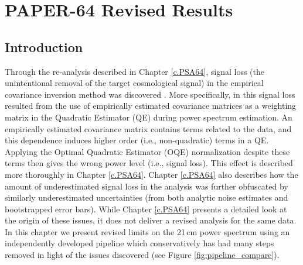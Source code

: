 \newcommand{\upperlims}{$(1440$ mK$)^{2}$, $(1850$ mK$)^{2}$, $(290$ mK$)^{2}$, $(190$ mK$)^{2}$, $(360$ mK$)^{2}$, $(290$ mK$)^{2}$ at redshifts $z=10.87,\ 9.93,\ 8.68,\ 8.37,\  8.13,$ and $7.48$, respectively}
\newcommand{\hMpci}{h\ {\rm Mpc}^{-1}}

\chapter{PAPER-64 Revised Results}
\label{c.PSA64_results}

\section{Introduction}

Through the re-analysis described in Chapter \ref{c.PSA64}, signal loss (the
unintentional removal of the target cosmological signal) in the empirical covariance
inversion method was discovered \citep{ali_et_al2018}. More specifically, in  this signal loss resulted from the use of empirically estimated covariance
matrices as a weighting matrix in the Quadratic Estimator (QE)
during power spectrum estimation.
An empirically estimated covariance matrix contains
terms related to the data, and this dependence induces higher order (i.e., non-quadratic) terms in a QE.
Applying the Optimal Quadratic Estimator (OQE) normalization despite these terms then gives the
wrong power level (i.e., signal loss). This effect is described
more thoroughly in Chapter \ref{c.PSA64}.
Chapter \ref{c.PSA64} also describes how the amount of underestimated signal loss
in the  analysis was further obfuscated by similarly underestimated uncertainties (from both analytic noise estimates and bootstrapped error bars). While Chapter \ref{c.PSA64} presents a detailed look
at the origin of these issues, it does not deliver a revised analysis for the same data. In this chapter we present revised limits on the 21\,cm power spectrum using an independently developed pipeline which conservatively has had many steps removed in light of the issues discovered (see Figure \ref{fig:pipeline_compare}).

